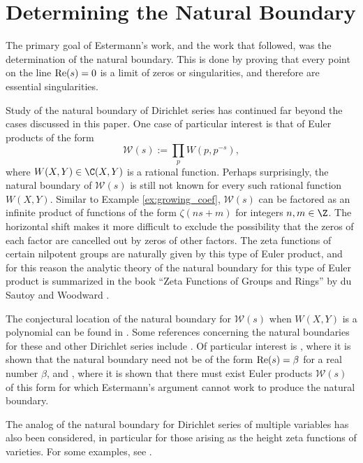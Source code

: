 \documentclass[12pt]{amsart}
\theoremstyle{plain}
\begin{document}
\section{Determining the Natural Boundary}\label{sec:natural_boundary}

The primary goal of Estermann's work, and the work that followed, was the determination of the natural boundary. This is done by proving that every point on the line ${\rm Re}(s)=0$ is a limit of zeros or singularities, and therefore are essential singularities.

Study of the natural boundary of Dirichlet series has continued far beyond the cases discussed in this paper. One case of particular interest is that of Euler products of the form
\[
    \mathcal{W}(s) := \prod_p W(p,p^{-s}),
\]
where $W(X,Y)\in \C(X,Y)$ is a rational function. Perhaps surprisingly, the natural boundary of $\mathcal{W}(s)$ is still not known for every such rational function $W(X,Y)$. Similar to Example \ref{ex:growing_coef}, $\mathcal{W}(s)$ can be factored as an infinite product of functions of the form $\zeta(ns+m)$ for integers $n,m\in \Z$. The horizontal shift makes it more difficult to exclude the possibility that the zeros of each factor are cancelled out by zeros of other factors. The zeta functions of certain nilpotent groups are naturally given by this type of Euler product, and for this reason the analytic theory of the natural boundary for this type of Euler product is summarized in the book ``Zeta Functions of Groups and Rings'' by du Sautoy and Woodward \cite[Section 5]{duSautoy-Woodward2008}.

The conjectural location of the natural boundary for $\mathcal{W}(s)$ when $W(X,Y)$ is a polynomial can be found in \cite[Conjecture 1.4]{bhowmik2010}. Some references concerning the natural boundaries for these and other Dirichlet series include \cite{bhowmik-schlage-puchta2007,essouabri_velásquez_castañón_2020,han_ki_park_2021}. Of particular interest is \cite{bhowmik-schlage-puchta2016}, where it is shown that the natural boundary need not be of the form ${\rm Re}(s) = \beta$ for a real number $\beta$, and \cite{bhowmik-schlage-puchta2010}, where it is shown that there must exist Euler products $\mathcal{W}(s)$ of this form for which Estermann's argument cannot work to produce the natural boundary.

The analog of the natural boundary for Dirichlet series of multiple variables has also been considered, in particular for those arising as the height zeta functions of varieties. For some examples, see \cite{delabarre_2013,delabarre2014,essouabri2012height,bhowmik_essouabri_lichtin_2007}.
\end{document}
